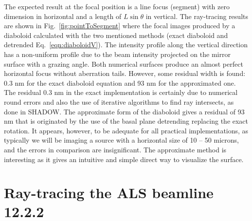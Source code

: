\documentclass{iucr}              %
\begin{document}
The expected result at the focal position is a line focus (segment) with zero dimension in horizontal and a length of $L\sin\theta$ in vertical. The ray-tracing results are shown in Fig.~\ref{fig:pointToSegment} where the focal images produced by a diaboloid calculated with the two mentioned methods (exact diaboloid and detrended Eq.~\ref{eqn:diaboloidV}).
The intensity profile along the vertical direction has a non-uniform profile due to the beam intensity projected on the mirror surface with a grazing angle.
Both numerical surfaces produce an almost perfect horizontal focus without aberration tails. However, some residual width is found: 0.3 nm for the exact diaboloid equation and 93 nm for the approximated one. 
The residual 0.3 nm in the exact implementation is certainly due to numerical round errors and also the use of iterative algorithms to find ray intersects, as done in SHADOW.
The approximate form of the diaboloid gives a residual of 93 nm that is originated by the use of the basal plane detrending replacing the exact rotation. It appears, however, to be adequate for all practical implementations, as typically we will be imaging a source with a horizontal size of 10 – 50 microns, and the errors in comparison are insignificant. The approximate method is interesting as it gives an intuitive and simple direct way to visualize the surface.

\section{Ray-tracing the ALS beamline 12.2.2}
\label{sec:beamline}
\end{document}
